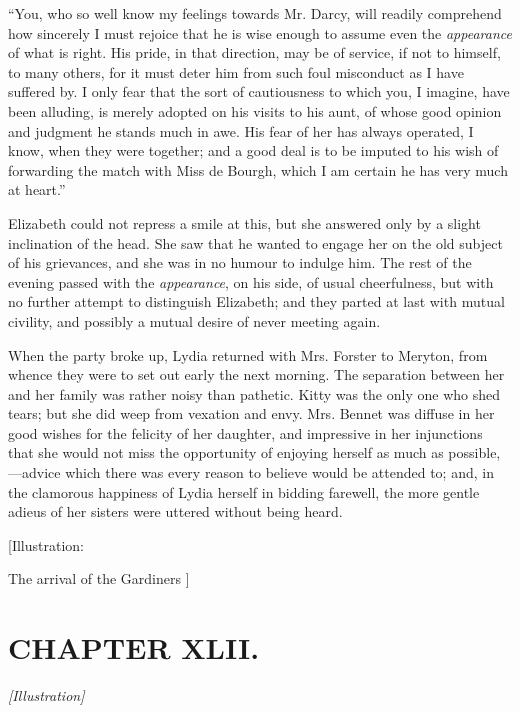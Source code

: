 \documentclass[12pt]{book}
\begin{document}
``You, who so well know my feelings towards Mr. Darcy, will readily comprehend how sincerely I must rejoice that he is wise enough to assume even the \textit{appearance} of what is right. His pride, in that direction, may be of service, if not to himself, to many others, for it must deter him from such foul misconduct as I have suffered by. I only fear that the sort of cautiousness to which you, I imagine, have been alluding, is merely adopted on his visits to his aunt, of whose good opinion and judgment he stands much in awe. His fear of her has always operated, I know, when they were together; and a good deal is to be imputed to his wish of forwarding the match with Miss de Bourgh, which I am certain he has very much at heart.''

Elizabeth could not repress a smile at this, but she answered only by a slight inclination of the head. She saw that he wanted to engage her on the old subject of his grievances, and she was in no humour to indulge him. The rest of the evening passed with the \textit{appearance}, on his side, of usual cheerfulness, but with no further attempt to distinguish Elizabeth; and they parted at last with mutual civility, and possibly a mutual desire of never meeting again.

When the party broke up, Lydia returned with Mrs. Forster to Meryton, from whence they were to set out early the next morning. The separation between her and her family was rather noisy than pathetic. Kitty was the only one who shed tears; but she did weep from vexation and envy. Mrs. Bennet was diffuse in her good wishes for the felicity of her daughter, and impressive in her injunctions that she would not miss the opportunity of enjoying herself as much as possible,---advice which there was every reason to believe would be attended to; and, in the clamorous happiness of Lydia herself in bidding farewell, the more gentle adieus of her sisters were uttered without being heard.

[Illustration:

The arrival of the Gardiners ]

\chapter{CHAPTER XLII.}

\emph{[Illustration]}
\end{document}
